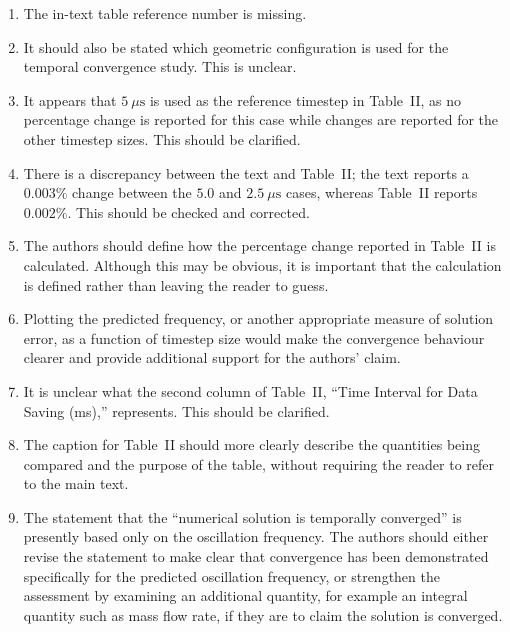 \documentclass[11pt]{article}
\begin{document}
	\begin{enumerate}
		\item The in-text table reference number is missing.
		
		\item It should also be stated which geometric configuration is used for the temporal convergence study. This is unclear.
		
		\item It appears that $5~\mu\mathrm{s}$ is used as the reference timestep in Table~II, as no percentage change is reported for this case while changes are reported for the other timestep sizes. This should be clarified.
		
		\item There is a discrepancy between the text and Table~II; the text reports a $0.003\%$ change between the $5.0$ and $2.5~\mu\mathrm{s}$ cases, whereas Table~II reports $0.002\%$. This should be checked and corrected.
		
		\item The authors should define how the percentage change reported in Table~II is calculated. Although this may be obvious, it is important that the calculation is defined rather than leaving the reader to guess.
		
		\item Plotting the predicted frequency, or another appropriate measure of solution error, as a function of timestep size would make the convergence behaviour clearer and provide additional support for the authors' claim.
		
		\item It is unclear what the second column of Table~II, ``Time Interval for Data Saving (ms),'' represents. This should be clarified.
		
		\item The caption for Table~II should more clearly describe the quantities being compared and the purpose of the table, without requiring the reader to refer to the main text.
		
		\item The statement that the ``numerical solution is temporally converged'' is presently based only on the oscillation frequency. The authors should either revise the statement to make clear that convergence has been demonstrated specifically for the predicted oscillation frequency, or strengthen the assessment by examining an additional quantity, for example an integral quantity such as mass flow rate, if they are to claim the solution is converged.
	\end{enumerate}
	
\end{document}

